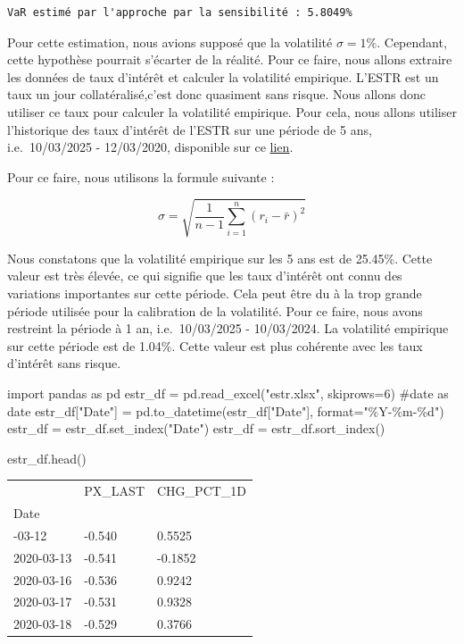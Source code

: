 \documentclass[
  letterpaper,
  DIV=11,
  numbers=noendperiod]{scrartcl}
\newenvironment{Shaded}{\begin{snugshade}}{\end{snugshade}}
\newcommand{\BuiltInTok}[1]{\textcolor[rgb]{0.00,0.23,0.31}{#1}}
\newcommand{\CommentTok}[1]{\textcolor[rgb]{0.37,0.37,0.37}{#1}}
\newcommand{\DecValTok}[1]{\textcolor[rgb]{0.68,0.00,0.00}{#1}}
\newcommand{\ImportTok}[1]{\textcolor[rgb]{0.00,0.46,0.62}{#1}}
\newcommand{\NormalTok}[1]{\textcolor[rgb]{0.00,0.23,0.31}{#1}}
\newcommand{\OperatorTok}[1]{\textcolor[rgb]{0.37,0.37,0.37}{#1}}
\newcommand{\SpecialCharTok}[1]{\textcolor[rgb]{0.37,0.37,0.37}{#1}}
\newcommand{\StringTok}[1]{\textcolor[rgb]{0.13,0.47,0.30}{#1}}
\begin{document}
\begin{verbatim}
VaR estimé par l'approche par la sensibilité : 5.8049%
\end{verbatim}

Pour cette estimation, nous avions supposé que la volatilité
\(\sigma = 1\%\). Cependant, cette hypothèse pourrait s'écarter de la
réalité. Pour ce faire, nous allons extraire les données de taux
d'intérêt et calculer la volatilité empirique. L'ESTR est un taux un
jour collatéralisé,c'est donc quasiment sans risque. Nous allons donc
utiliser ce taux pour calculer la volatilité empirique. Pour cela, nous
allons utiliser l'historique des taux d'intérêt de l'ESTR sur une
période de 5 ans, i.e.~10/03/2025 - 12/03/2020, disponible sur ce
\href{estr.xlsx}{lien}.

Pour ce faire, nous utilisons la formule suivante :

\[
\sigma = \sqrt{\frac{1}{n-1} \sum_{i=1}^{n} (r_i - \bar{r})^2}
\]

Nous constatons que la volatilité empirique sur les 5 ans est de
25.45\%. Cette valeur est très élevée, ce qui signifie que les taux
d'intérêt ont connu des variations importantes sur cette période. Cela
peut être du à la trop grande période utilisée pour la calibration de la
volatilité. Pour ce faire, nous avons restreint la période à 1 an,
i.e.~10/03/2025 - 10/03/2024. La volatilité empirique sur cette période
est de 1.04\%. Cette valeur est plus cohérente avec les taux d'intérêt
sans risque.

\begin{Shaded}
\begin{Highlighting}[]
\ImportTok{import}\NormalTok{ pandas }\ImportTok{as}\NormalTok{ pd}
\NormalTok{estr\_df }\OperatorTok{=}\NormalTok{ pd.read\_excel(}\StringTok{"estr.xlsx"}\NormalTok{, skiprows}\OperatorTok{=}\DecValTok{6}\NormalTok{)}
\CommentTok{\#date as date}
\NormalTok{estr\_df[}\StringTok{"Date"}\NormalTok{] }\OperatorTok{=}\NormalTok{ pd.to\_datetime(estr\_df[}\StringTok{"Date"}\NormalTok{], }\BuiltInTok{format}\OperatorTok{=}\StringTok{"\%Y{-}\%m{-}}\SpecialCharTok{\%d}\StringTok{"}\NormalTok{)}
\NormalTok{estr\_df }\OperatorTok{=}\NormalTok{ estr\_df.set\_index(}\StringTok{"Date"}\NormalTok{)}
\NormalTok{estr\_df }\OperatorTok{=}\NormalTok{ estr\_df.sort\_index()}

\NormalTok{estr\_df.head()}
\end{Highlighting}
\end{Shaded}

\begin{longtable}[]{@{}lll@{}}
\toprule\noalign{}
& PX\_LAST & CHG\_PCT\_1D \\
Date & & \\
\midrule\noalign{}
\endhead
\bottomrule\noalign{}
\endlastfoot
2020-03-12 & -0.540 & 0.5525 \\
2020-03-13 & -0.541 & -0.1852 \\
2020-03-16 & -0.536 & 0.9242 \\
2020-03-17 & -0.531 & 0.9328 \\
2020-03-18 & -0.529 & 0.3766 \\
\end{longtable}
\end{document}

